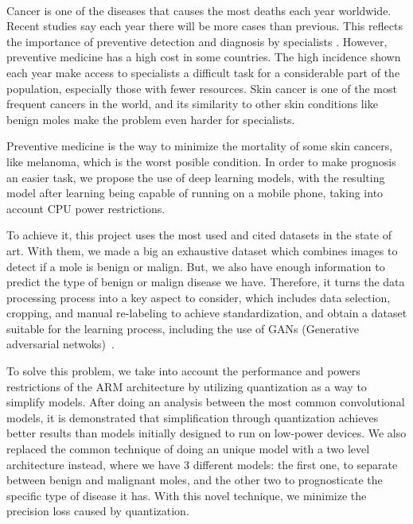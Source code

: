 \vspace{0.7cm}
\\

Cancer is one of the diseases that causes the most deaths each year worldwide. Recent studies say each year there will be more cases than previous. This reflects the importance of preventive detection and diagnosis by specialists . However, preventive medicine has a high cost in some countries. The high incidence shown each year make access to specialists a difficult task for a considerable part of the population, especially those with fewer resources. Skin cancer is one of the most frequent cancers in the world, and its similarity to other skin conditions like benign moles make the problem even harder for specialists.

Preventive medicine is the way to minimize the mortality of some skin cancers, like melanoma, which is the worst posible condition. In order to make prognosis an easier task, we propose the use of deep learning models, with the resulting model after learning being capable of running on a mobile phone, taking into account CPU power restrictions.

To achieve it, this project uses the most used and cited datasets in the state of art. With them, we made a big an exhaustive dataset which combines images to detect if a mole is benign or malign. But, we also have enough information to predict the type of benign or malign disease we have. Therefore, it turns the data processing process into a key aspect to consider, which includes data selection, cropping, and manual re-labeling to achieve standardization, and obtain a dataset suitable for the learning process, including the use of GANs (Generative adversarial netwoks)~\cite{goodfellow2014generative}.

To solve this problem, we take into account the performance and powers restrictions of the ARM architecture by utilizing quantization as a way to simplify models. After doing an analysis between the most common convolutional models, it is demonstrated that simplification through quantization achieves better results than models initially designed to run on low-power devices.  We also replaced the common technique of doing an unique model with a two level architecture instead, where we have 3 different models: the first one, to separate between benign and malignant moles, and the other two to prognosticate the specific type of disease it has. With this novel technique, we minimize the precision loss caused by quantization.

